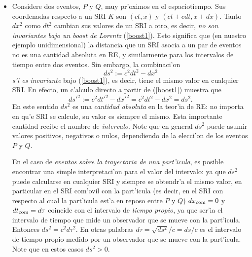 \begin{itemize}
\item Considere dos eventos, $P$ y $Q$, muy pr'oximos en el espaciotiempo. Sus coordenadas respecto a un SRI $K$ son $(ct,x)$ y $(ct+cdt,x+dx)$. Tanto $dx^2$ como $dt^2$ cambian sus valores de un SRI a otro, es decir,  \textit{no son invariantes bajo un boost de Lorentz} (\ref{boost1}). Esto significa que (en nuestro ejemplo unidimensional) la distancia que un SRI asocia a un par de eventos no es una cantidad absoluta en RE, y similarmente para los intervalos de tiempo entre dos eventos. Sin embargo, la combinaci'on
\begin{equation}
ds^2:=c^2dt^2-dx^2
\end{equation}
\textit{s'i es invariante} bajo (\ref{boost1}), es decir, tiene el mismo valor en cualquier SRI. En efecto, un c'alculo directo a partir de (\ref{boost1}) muestra que
\begin{equation}
ds'^2:=c^2dt'^2-dx'^2=c^2dt^2-dx^2=ds^2.
\end{equation}
En este sentido $ds^2$ es una \textit{cantidad absoluta} en la teor'ia de RE: no importa en qu'e SRI se calcule, su valor es siempre el mismo. Esta importante cantidad recibe el nombre de \textit{intervalo}. Note que en general $ds^2$ puede asumir valores positivos, negativos o nulos, dependiendo de la elecci'on de los eventos $P$ y $Q$.

En el caso de \textit{eventos sobre la trayectoria de una part'icula}, es posible encontrar una simple interpretaci'on para el valor del intervalo: ya que $ds^2$ puede calcularse en cualquier SRI y siempre se obtendr'a el mismo valor, en particular en el SRI com'ovil con la part'icula (es decir, en el SRI con respecto al cual la part'icula est'a en reposo entre $P$ y $Q$) $dx_{\rm com}=0$ y $dt_{\rm com}=d\tau$ coincide con el intervalo de \textit{tiempo propio}, ya que ser'ia el intervalo de tiempo que mide un observador que se mueve con la part'icula. Entonces $ds^2=c^2d\tau^2$. En otras palabras $d\tau=\sqrt{ds^2}/c=ds/c$ es el intervalo de tiempo propio medido por un observador que se mueve con la part'icula. Note que en estos casos $ds^2>0$.

\end{itemize}




